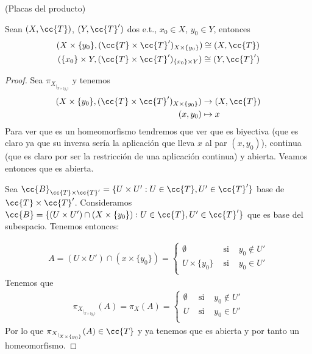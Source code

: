 \begin{prop}(Placas del producto)\ 

    Sean $(X, \cc{T})$, $(Y, \cc{T}')$ dos e.t., $x_0\in X$, $y_0\in Y$, entonces
    \begin{align*}
        (X\times \{y_0\}, (\cc{T}\times \cc{T}')_{X\times\{y_0\}})\cong (X, \cc{T})\\
        (\{x_0\}\times Y, (\cc{T}\times \cc{T}')_{\{x_0\}\times Y})\cong (Y, \cc{T}')
    \end{align*}

    \begin{proof}
        Sea $\pi_{X_{|_{X\times \{y_0\}}}}$ y tenemos
        \begin{align*}
            (X\times \{y_0\}, (\cc{T}\times \cc{T}')_{X\times \{y_0\}}) &\to (X, \cc{T})\\
            (x,y_0) &\mapsto x
        \end{align*}
        Para ver que es un homeomorfismo tendremos que ver que es biyectiva (que es claro ya que su inversa sería la aplicación que lleva $x$ al par $(x,y_0)$), continua (que es claro por ser la restricción de una aplicación continua) y abierta. Veamos entonces que es abierta.

        Sea $\cc{B}_{\cc{T}\times \cc{T}'}=\{U\times U': U\in \cc{T}, U'\in \cc{T}'\}$ base de $\cc{T}\times \cc{T}'$. Consideramos $\cc{B}=\{(U\times U')\cap (X\times \{y_0\}): U\in \cc{T}, U'\in \cc{T}'\}$ que es base del subespacio. Tenemos entonces:
        
        \begin{align*}
            A=(U\times U')\cap (x\times \{y_0\}) = \left\{
            \begin{array}{lcc}
                \emptyset & \text{ si } & y_0\notin U'\\
                U\times \{y_0\} & \text{ si } & y_0\in U'\\
            \end{array}
            \right.
        \end{align*}
        Tenemos que
        \begin{align*}
            \pi_{X_{|_{X\times\{y_0\}}}} (A) = \pi_X(A) = \left\{
                \begin{array}{lcc}
                    \emptyset & \text{ si } & y_0\notin U'\\
                    U & \text{ si } & y_0\in U'\\
                \end{array}
                \right.
        \end{align*}
        Por lo que $\pi_{X_{|_{X\times\{y_0\}}}} (A)\in \cc{T}$ y ya tenemos que es abierta y por tanto un homeomorfismo.
    \end{proof}
\end{prop}

